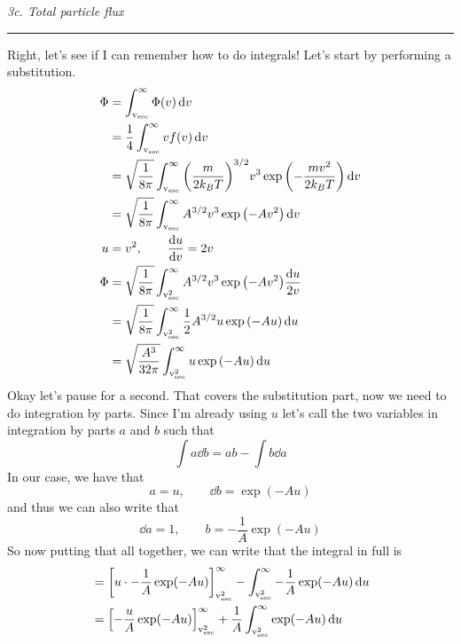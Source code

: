 \documentclass[12pt, letterpaper, twoside]{article}
\newcommand{\question}[1]{{\noindent \it #1}}
\newcommand{\answer}[1]{
    \par\noindent\rule{\textwidth}{0.4pt}#1\vspace{0.5cm}
}
\begin{document}
\question{3c. Total particle flux}
\answer{
    Right, let's see if I can remember how to do integrals! Let's start by performing a substitution.
    \begin{align}
        \Phi &= \int_{\rm v_{\rm esc}}^{\infty} \Phi(v) \dd{v} \\
             &= \frac{1}{4} \int_{\rm v_{\rm esc}}^{\infty} v f(v) \dd{v} \\
             &= \sqrt{\frac{1}{8 \pi}} \int_{\rm v_{\rm esc}}^{\infty} \qty( \frac{m}{2 k_B T} )^{3/2} v^3 \exp \qty(- \frac{m v^2}{2 k_B T}) \dd{v} \\
             &= \sqrt{\frac{1}{8 \pi}} \int_{\rm v_{\rm esc}}^{\infty} A^{3/2} v^3 \exp \qty(- A v^2) \dd{v} \\
           u &= v^2, \qquad \dv{u}{v} = 2 v \\
        \Phi &= \sqrt{\frac{1}{8 \pi}} \int_{\rm v_{\rm esc}^2}^{\infty} A^{3/2} v^3 \exp \qty(- A v^2) \frac{\dd{u}}{2 v} \\
             &= \sqrt{\frac{1}{8 \pi}} \int_{\rm v_{\rm esc}^2}^{\infty} \frac{1}{2} A^{3/2} u \exp \qty(- A u) \dd{u} \\
             &= \sqrt{\frac{A^3}{32 \pi}} \int_{\rm v_{\rm esc}^2}^{\infty} u \exp \qty(- A u) \dd{u}
    \end{align}
    Okay let's pause for a second. That covers the substitution part, now we need to do integration by parts. Since I'm already using $u$ let's call the two variables in integration by parts $a$ and $b$ such that
    \begin{equation}
        \int a \dd{b} = a b - \int b \dd{a}
    \end{equation}
    In our case, we have that
    \begin{equation}
        a = u,\qquad \dd{b} = \exp(- A u)
    \end{equation}
    and thus we can also write that
    \begin{equation}
        \dd{a} = 1,\qquad b = - \frac{1}{A} \exp(- A u)
    \end{equation}
    So now putting that all together, we can write that the integral in full is
    \begin{align}
        &= \qty[ u \cdot - \frac{1}{A} \exp(- A u)]_{\rm v_{\rm esc}^2}^{\infty} - \int_{\rm v_{\rm esc}^2}^{\infty} - \frac{1}{A} \exp(- A u) \dd{u} \\
        &= \qty[ - \frac{u}{A} \exp(- A u)]_{\rm v_{\rm esc}^2}^{\infty} + \frac{1}{A} \int_{\rm v_{\rm esc}^2}^{\infty} \exp(- A u) \dd{u} \\

\end{align}}
\end{document}

